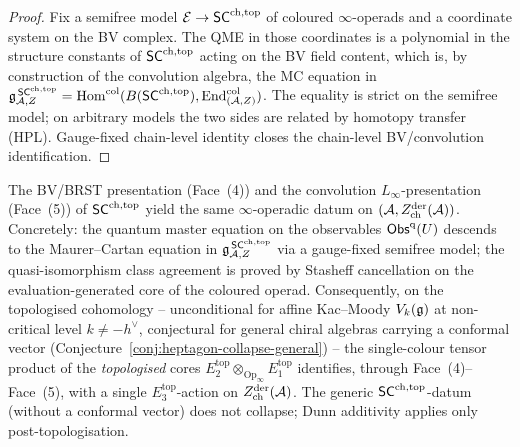 \begin{proof}
Fix a semifree model $\mathcal{E}\to\mathsf{SC}^{\mathrm{ch},\mathrm{top}}$ of coloured $\infty$-operads
and a coordinate system on the BV complex. The QME in those
coordinates is a polynomial in the structure constants of
$\mathsf{SC}^{\mathrm{ch},\mathrm{top}}$ acting on the BV field content, which is, by
construction of the convolution algebra, the MC equation in
$\mathfrak{g}^{\,\mathsf{SC}^{\mathrm{ch},\mathrm{top}}}_{\mathcal{A},Z}=\mathrm{Hom}^{\mathrm{col}}(B(\mathsf{SC}^{\mathrm{ch},\mathrm{top}}),
\mathrm{End}^{\mathrm{col}}_{(\mathcal{A},Z)})$. The equality is strict on the
semifree model; on arbitrary models the two sides are related by
homotopy transfer (HPL). Gauge-fixed chain-level identity closes
the chain-level BV/convolution identification.
\end{proof}

\begin{proposition}\label{prop:heptagon-edge-45}%
%
The BV/BRST presentation (Face~(4)) and the convolution
$L_\infty$-presentation (Face~(5)) of $\mathsf{SC}^{\mathrm{ch},\mathrm{top}}$ yield the same
$\infty$-operadic datum on $(\mathcal{A}, Z^{\mathrm{der}}_{\mathrm{ch}}(\mathcal{A}))$.
Concretely: the quantum master equation on the observables
$\mathsf{Obs}^{\mathrm{q}}(U)$ descends to the Maurer--Cartan equation in
$\mathfrak{g}^{\,\mathsf{SC}^{\mathrm{ch},\mathrm{top}}}_{\mathcal{A},Z}$ via a gauge-fixed semifree model; the
quasi-isomorphism class agreement is proved by Stasheff cancellation
on the evaluation-generated core of the coloured operad.
Consequently, on the topologised cohomology -- unconditional for
affine Kac--Moody $V_k(\mathfrak{g})$ at non-critical level $k\neq -h^{\vee}$,
conjectural for general chiral algebras carrying a conformal vector
(Conjecture~\ref{conj:heptagon-collapse-general}) -- the
single-colour tensor product of the \emph{topologised} cores
$E_2^{\mathrm{top}}\otimes_{\mathrm{Op}_\infty}E_1^{\mathrm{top}}$
identifies, through Face~(4)--Face~(5),
with a single $E_3^{\mathrm{top}}$-action on
$Z^{\mathrm{der}}_{\mathrm{ch}}(\mathcal{A})$. The generic
$\mathsf{SC}^{\mathrm{ch},\mathrm{top}}$-datum (without a conformal vector) does not collapse;
Dunn additivity applies only post-topologisation.
\end{proposition}

